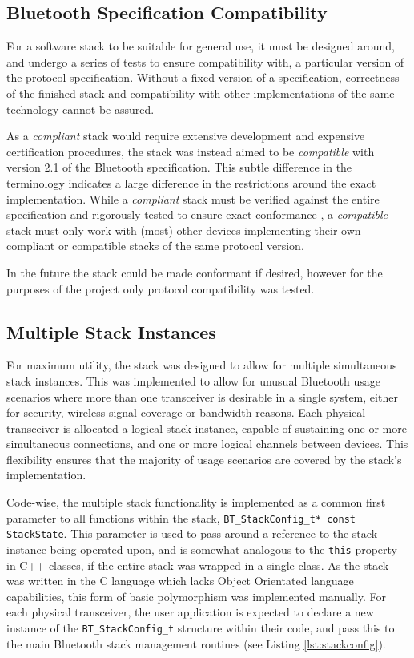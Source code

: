 \subsection{Bluetooth Specification Compatibility}

For a software stack to be suitable for general use, it must be designed around, and undergo a series of tests to ensure compatibility with, a particular version of the protocol specification. Without a fixed version of a specification, correctness of the finished stack and compatibility with other implementations of the same technology cannot be assured.

As a \textit{compliant} stack would require extensive development and expensive certification procedures, the stack was instead aimed to be \textit{compatible} with version 2.1 of the Bluetooth specification. This subtle difference in the terminology indicates a large difference in the restrictions around the exact implementation. While a \textit{compliant} stack must be verified against the entire specification and rigorously tested to ensure exact conformance \cite{bt2p1specs_conformance}, a \textit{compatible} stack must only work with (most) other devices implementing their own compliant or compatible stacks of the same protocol version.

In the future the stack could be made conformant if desired, however for the purposes of the project only protocol compatibility was tested.

\subsection{Multiple Stack Instances}

For maximum utility, the stack was designed to allow for multiple simultaneous stack instances. This was implemented to allow for unusual Bluetooth usage scenarios where more than one transceiver is desirable in a single system, either for security, wireless signal coverage or bandwidth reasons. Each physical transceiver is allocated a logical stack instance, capable of sustaining one or more simultaneous connections, and one or more logical channels between devices. This flexibility ensures that the majority of usage scenarios are covered by the stack's implementation.

Code-wise, the multiple stack functionality is implemented as a common first parameter to all functions within the stack, \lstinline{BT_StackConfig_t* const StackState}. This parameter is used to pass around a reference to the stack instance being operated upon, and is somewhat analogous to the \lstinline{this} property in C++ classes, if the entire stack was wrapped in a single class. As the stack was written in the C language which lacks Object Orientated language capabilities, this form of basic polymorphism was implemented manually. For each physical transceiver, the user application is expected to declare a new instance of the \lstinline{BT_StackConfig_t} structure within their code, and pass this to the main Bluetooth stack management routines (see Listing \ref{lst:stackconfig}).

